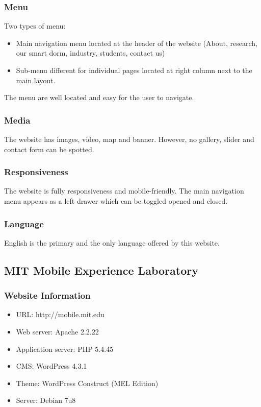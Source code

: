 \subsubsection*{Menu}
Two types of menu:
\begin{itemize}
\item Main navigation menu located at the header of the website (About, research, our smart dorm, industry, students, contact us)
\item Sub-menu different for individual pages located at right column next to the main layout.
\end{itemize}

The menu are well located and easy for the user to navigate.

\subsubsection*{Media}
The website has images, video, map and banner. However, no gallery, slider and contact form can be spotted.

\subsubsection*{Responsiveness}
The website is fully responsiveness and mobile-friendly. The main navigation menu appears as a left drawer which can be toggled opened and closed.

\subsubsection*{Language}
English is the primary and the only language offered by this website.

\subsection{MIT Mobile Experience Laboratory}
\subsubsection*{Website Information}
\begin{itemize}
\item URL: http://mobile.mit.edu
\item Web server: Apache 2.2.22
\item Application server: PHP 5.4.45
\item CMS: WordPress 4.3.1
\item Theme: WordPress Construct (MEL Edition)
\item Server: Debian 7u8
\end{itemize}

